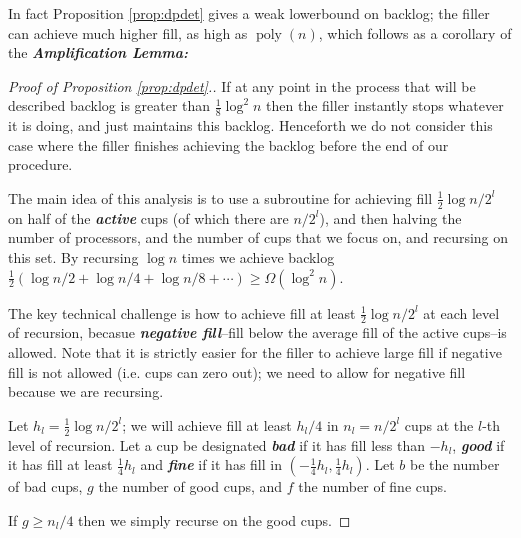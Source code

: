 \documentclass{article}[11pt]
\newcommand{\defn}[1]{{\textit{\textbf{\boldmath #1}}}}
\DeclareMathOperator{\poly}{\text{poly}}
\begin{document}
In fact Proposition \ref{prop:dpdet} gives a weak lowerbound on backlog; the
filler can achieve much higher fill, as high as $\poly(n)$, which follows as a
corollary of the \defn{Amplification Lemma:}

\begin{proof}[Proof of Proposition \ref{prop:dpdet}.]
  If at any point in the process that will be described backlog is greater than
  $\frac{1}{8}\log^2 n$ then the filler instantly stops whatever it is doing,
  and just maintains this backlog. Henceforth we do not consider this case
  where the filler finishes achieving the backlog before the end of our procedure.

  The main idea of this analysis is to use a subroutine for achieving fill
  $\frac{1}{2}\log n/2^l$ on half of the \defn{active} cups (of which there are $n/2^l$),
  and then halving the number of processors, and the number of cups that we
  focus on, and recursing on this set. By recursing $\log n$ times we achieve
  backlog $\frac{1}{2}(\log n/2 + \log n/4 + \log n/8 + \cdots) \ge
  \Omega(\log^2 n)$.

  The key technical challenge is how to achieve fill at least $\frac{1}{2}\log n/2^l$ at
  each level of recursion, becasue \defn{negative fill}--fill below the average
  fill of the active cups--is allowed.  Note that it is strictly easier for the
  filler to achieve large fill if negative fill is not allowed (i.e. cups can
  zero out); we need to allow for negative fill because we are recursing. 



  Let $h_l = \frac{1}{2}\log n/2^l$; we will achieve fill at least $h_l/4$
  in $n_l = n/2^{l}$ cups at the $l$-th level of recursion. Let a cup be designated
  \defn{bad} if it has fill less than $-h_l$, \defn{good} if it has
  fill at least $\frac{1}{4}h_l$ and \defn{fine} if it has fill in
  $(-\frac{1}{4}h_l, \frac{1}{4}h_l)$. Let $b$ be the number of bad cups, $g$
  the number of good cups, and $f$ the number of fine cups.

  If $g \ge n_l/4$ then we simply recurse on the good cups.


\end{proof}
\end{document}

